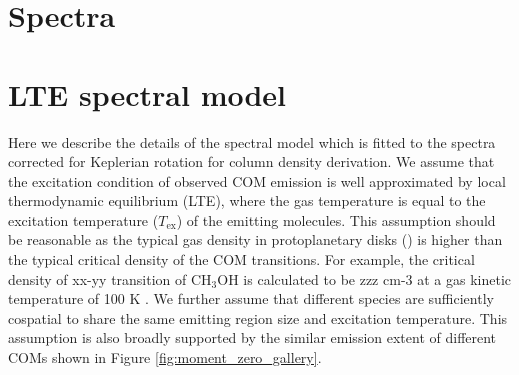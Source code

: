 \documentclass[linenumbers, twocolumn, twocolappendix, astrosymb, times]{aastex631}
\newcommand{\methanol}{CH$_3$OH\xspace}
\newcommand{\acetaldehyde}{CH$_3$CHO\xspace}
\newcommand{\methylformate}{CH$_3$OCHO\xspace}
\begin{document}





\section{Spectra}\label{appendix:spectra}
\begin{figure*}
\caption{\methanol spectrum for each transition without spectral line blending.}
\label{fig:CH3OH_spectra}
\end{figure*}

\begin{figure*}
\caption{Same as Figure \ref{fig:CH3OH_spectra}, but for \methylformate.}
\label{fig:CH3OCHO_spectra}
\end{figure*}

\begin{figure*}
\caption{Same as Figure \ref{fig:CH3OH_spectra}, but for \acetaldehyde.}
\label{fig:CH3CHO_spectra}
\end{figure*}

\section{LTE spectral model}\label{appendix:spectral_model}
Here we describe the details of the spectral model which is fitted to the spectra corrected for Keplerian rotation for column density derivation. We assume that the excitation condition of observed COM emission is well approximated by local thermodynamic equilibrium (LTE), where the gas temperature is equal to the excitation temperature ($T_\mathrm{ex}$) of the emitting molecules. This assumption should be reasonable as the typical gas density in protoplanetary disks () is higher than the typical critical density of the COM transitions. For example, the critical density of xx-yy transition of \methanol is calculated to be zzz cm-3 at a gas kinetic temperature of 100 K \citep[ref][]{}. We further assume that different species are sufficiently cospatial to share the same emitting region size and excitation temperature. This assumption is also broadly supported by the similar emission extent of different COMs shown in Figure \ref{fig:moment_zero_gallery}. 
\end{document}
